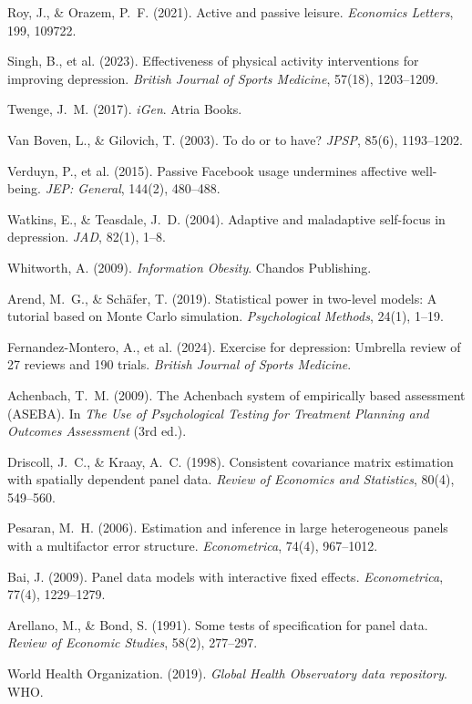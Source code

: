 \documentclass[a4paper,11pt,titlepage]{article}
\begin{document}
\begin{enumerate}[label={[\arabic*]}, leftmargin=2em, itemsep=2pt]
  \item Roy, J., \& Orazem, P.~F. (2021). Active and passive leisure. \textit{Economics Letters}, 199, 109722.
  \item Singh, B., et al. (2023). Effectiveness of physical activity interventions for improving depression. \textit{British Journal of Sports Medicine}, 57(18), 1203--1209.
  \item Twenge, J.~M. (2017). \textit{iGen}. Atria Books.
  \item Van Boven, L., \& Gilovich, T. (2003). To do or to have? \textit{JPSP}, 85(6), 1193--1202.
  \item Verduyn, P., et al. (2015). Passive Facebook usage undermines affective well-being. \textit{JEP: General}, 144(2), 480--488.
  \item Watkins, E., \& Teasdale, J.~D. (2004). Adaptive and maladaptive self-focus in depression. \textit{JAD}, 82(1), 1--8.
  \item Whitworth, A. (2009). \textit{Information Obesity}. Chandos Publishing.
  \item Arend, M.~G., \& Sch\"afer, T. (2019). Statistical power in two-level models: A tutorial based on Monte Carlo simulation. \textit{Psychological Methods}, 24(1), 1--19.
  \item Fernandez-Montero, A., et al. (2024). Exercise for depression: Umbrella review of 27 reviews and 190 trials. \textit{British Journal of Sports Medicine}.
  \item Achenbach, T.~M. (2009). The Achenbach system of empirically based assessment (ASEBA). In \textit{The Use of Psychological Testing for Treatment Planning and Outcomes Assessment} (3rd ed.).
  \item Driscoll, J.~C., \& Kraay, A.~C. (1998). Consistent covariance matrix estimation with spatially dependent panel data. \textit{Review of Economics and Statistics}, 80(4), 549--560.
  \item Pesaran, M.~H. (2006). Estimation and inference in large heterogeneous panels with a multifactor error structure. \textit{Econometrica}, 74(4), 967--1012.
  \item Bai, J. (2009). Panel data models with interactive fixed effects. \textit{Econometrica}, 77(4), 1229--1279.
  \item Arellano, M., \& Bond, S. (1991). Some tests of specification for panel data. \textit{Review of Economic Studies}, 58(2), 277--297.
  \item World Health Organization. (2019). \textit{Global Health Observatory data repository}. WHO.

\end{enumerate}
\end{document}
